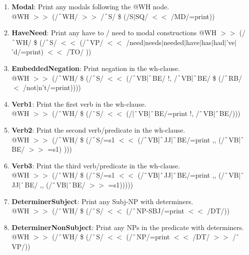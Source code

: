 \begin{enumerate}
    \item \textbf{Modal}: Print any modals following the @WH node.\\
    @WH $>\!\!>$ (/$\string^$WH/ $>\!\!>$ /$\string^$S/ \$ (/S$|$SQ/ $<\!\!<$ /MD/=print))
    
    \item \textbf{HaveNeed}: Print any \textsf{have to} / \textsf{need to} modal constructions
    @WH $>\!\!>$ (/$\string^$WH/ \$ (/$\string^$S/ $<\!\!<$ (/$\string^$VP/ $<\!\!<$ /need$|$needs$|$needed$|$have$|$has$|$had$|$'ve$|$'d/=print) $<\!\!<$ /TO/ ))
    
    \item \textbf{EmbeddedNegation}: Print negation in the wh-clause. \\
    @WH $>\!\!>$ (/$\string^$WH/ \$ (/$\string^$S/ $<\!\!<$ (/$\string^$VB$|\string^$BE/ !, /$\string^$VB$|\string^$BE/ \$ (/$\string^$RB/ $<$ /not$|$n't/=print))))

    \item \textbf{Verb1}: Print the first verb in the wh-clause. \\
    @WH $>\!\!>$ (/$\string^$WH/ \$ (/$\string^$S/ $<\!\!<$ (/$|\string^$VB$|\string^$BE/=print !, /$\string^$VB$|\string^$BE/)))

    \item \textbf{Verb2}: Print the second verb/predicate in the wh-clause.\\
    @WH $>\!\!>$ (/$\string^$WH/ \$ (/$\string^$S/=s1 $<\!\!<$ (/$\string^$VB$|\string^$JJ$|\string^$BE/=print ,, (/$\string^$VB$|\string^$BE/ $>\!\!>$ =s1) )))

    \item \textbf{Verb3}: Print the third verb/predicate in the wh-clause.\\
    @WH $>\!\!>$ (/$\string^$WH/ \$ (/$\string^$S/=s1 $<\!\!<$ (/$\string^$VB$|\string^$JJ$|\string^$BE/=print ,, (/$\string^$VB$|\string^$JJ$|\string^$BE/ ,, (/$\string^$VB$|\string^$BE/ $>\!\!>$ =s1)))))

    
    \item \textbf{DeterminerSubject}: Print any Subj-NP with determiners.\\
    @WH $>\!\!>$ (/$\string^$WH/ \$ (/$\string^$S/ $<\!\!<$ (/$\string^$NP-SBJ/=print $<\!\!<$ /DT/))
    
    \item \textbf{DeterminerNonSubject}: Print any NPs in the predicate with determiners.\\
    @WH $>\!\!>$ (/$\string^$WH/ \$ (/$\string^$S/ $<\!\!<$ (/$\string^$NP/=print $<\!\!<$ /DT/ $>\!\!>$ /$\string^$VP/))


\end{enumerate}
